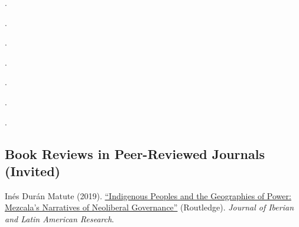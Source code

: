 \documentclass[letterpaper]{article}
\renewenvironment{itemize}{
  \begin{list}{}{
    \setlength{\leftmargin}{1.5em}
  }
}{
  \end{list}
}
\begin{document}
\begin{itemize}

  \item[\textcolor{gray}{\textbullet}] \href{https://doi.org/10.1111/pops.12940}{}.

  \item[\textcolor{gray}{\textbullet}] \href{https://doi.org/10.1016/j.electstud.2022.102497}{}.

  \item[\textcolor{gray}{\textbullet}] \href{https://link.springer.com/article/10.1057/s41269-020-00174-4}{}.

  \item[\textcolor{gray}{\textbullet}] \href{https://doi.org/10.1016/j.ejpoleco.2021.102048}{}.

  \item[\textcolor{gray}{\textbullet}] \href{https://doi.org/10.1111/rsp3.12337}{}.

  \item[\textcolor{gray}{\textbullet}] \href{https://doi.org/10.1177/1866802X1801000202}{}.

  \item[\textcolor{gray}{\textbullet}] \href{https://scielo.conicyt.cl/pdf/revcipol/v31n2/art07.pdf}{}.
  
\end{itemize}

\subsection*{Book Reviews in Peer-Reviewed Journals (Invited)}

\begin{itemize}
  \item[\textcolor{gray}{\textbullet}] In\'es Dur\'an Matute (2019). \href{https://doi.org/10.1080/13260219.2019.1671679}{``Indigenous Peoples and the Geographies of Power: Mezcala's Narratives of Neoliberal Governance''} (Routledge). \emph{Journal of Iberian and Latin American Research}. %
\end{itemize}




\bigskip
\end{document}
